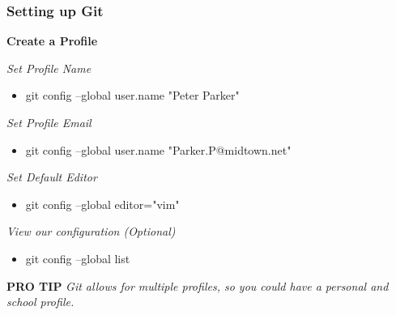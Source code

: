 \documentclass{beamer}
\begin{document}
\begin{frame}
	\frametitle{\textbf{Setting up Git}}

	\textbf{Create a Profile}
	\vspace{0.5cm}

	\textit{Set Profile Name}
	\begin{itemize}
		\item git config --global user.name "Peter Parker"
	\end{itemize}

	\textit{Set Profile Email}
	\begin{itemize}
		\item git config --global user.name "Parker.P@midtown.net"
	\end{itemize}

	\textit{Set Default Editor}
	\begin{itemize}
		\item git config --global editor="vim"
	\end{itemize}

	\textit{View our configuration (Optional)}
	\begin{itemize}
		\item git config --global list
	\end{itemize}

	\begin{block}{\textbf{PRO TIP}}
		\textit{Git allows for multiple profiles, so you could have a personal and 
		school profile.}
	\end{block}
\end{frame}
\end{document}
